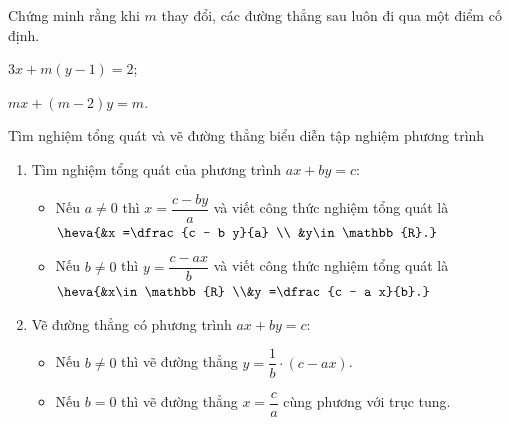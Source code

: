 \begin{vd}%
	Chứng minh rằng khi $m$ thay đổi, các đường thẳng sau luôn đi qua một điểm cố định.
	\begin{listEX}[2]
	\item $3x+m(y-1)=2$;
	\item $mx+(m-2)y=m$.
	\end{listEX}
\end{vd}
\begin{dang}{Tìm nghiệm tổng quát và vẽ đường thẳng biểu diễn tập nghiệm phương trình}
	\begin{enumerate}[\itemKN]
	\item Tìm nghiệm tổng quát của phương trình $a x + b y = c$:
	\begin{itemize}
	\item Nếu $a\ne 0$ thì $x =\dfrac{c - b y}{a}$ và viết công thức nghiệm tổng quát là
	$\heva{&x =\dfrac{c - b y}{a} \\ &y\in \mathbb{R}.}$
	\item Nếu $b\ne 0$ thì $y =\dfrac{c - a x}{b}$ và viết công thức nghiệm tổng quát là
	$\heva{&x\in \mathbb{R} \\&y =\dfrac{c - a x}{b}.}$
	\end{itemize}
	\item Vẽ đường thẳng có phương trình $a x + b y = c$:
	\begin{itemize}
	\item Nếu $b\ne 0$ thì vẽ đường thẳng $y =\dfrac{1}{b}\cdot(c - a x)$.
	\item Nếu $b=0$ thì vẽ đường thẳng $x =\dfrac{c}{a}$ cùng phương với trục tung.
	\end{itemize}
	\end{enumerate}
\end{dang}
